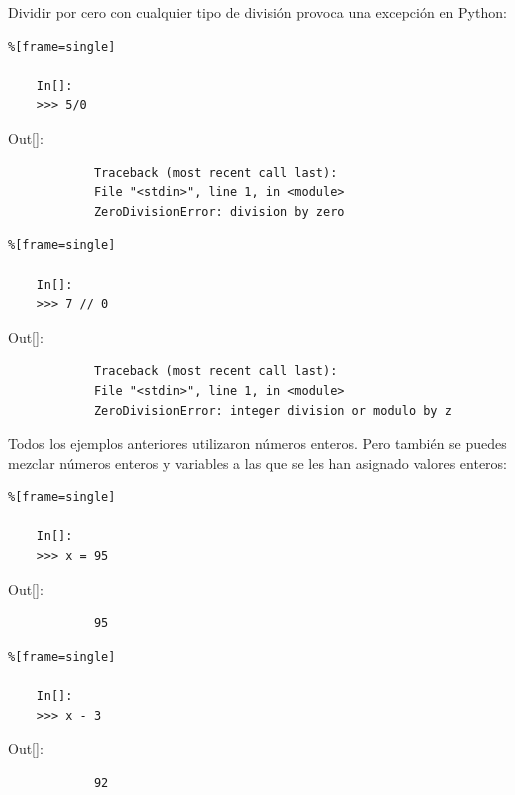 Dividir por cero con cualquier tipo de división provoca una excepción en Python:

\begin{lstlisting}%[frame=single]
	
	In[]:
	>>> 5/0
\end{lstlisting}

{\ttfamily\scriptsize\scriptsize 
	\hspace{-0.65cm}Out[]:\vspace{-0.15cm}	
	{\color{red} 	
		\begin{verbatim}
			Traceback (most recent call last):
			File "<stdin>", line 1, in <module>
			ZeroDivisionError: division by zero
		\end{verbatim}
}}
\vspace{-0.15cm}
\begin{lstlisting}%[frame=single]
	
	In[]:	
	>>> 7 // 0	
\end{lstlisting}

{\ttfamily\scriptsize\scriptsize 
	\hspace{-0.65cm}Out[]:\vspace{-0.15cm}	
	{\color{red} 	
		\begin{verbatim}
			Traceback (most recent call last):
			File "<stdin>", line 1, in <module>
			ZeroDivisionError: integer division or modulo by z
		\end{verbatim}
}}

Todos los ejemplos anteriores utilizaron números enteros. Pero también se puedes mezclar números enteros y variables a las que se les han asignado valores enteros:

\begin{lstlisting}%[frame=single]
	
	In[]:	
	>>> x = 95	
\end{lstlisting}

{\ttfamily\scriptsize\scriptsize 
	\hspace{-0.65cm}Out[]:\vspace{-0.15cm}	
	{\color{blue} 	
		\begin{verbatim}
			95
		\end{verbatim}
}}

\begin{lstlisting}%[frame=single]
	
	In[]:	
	>>> x - 3	
\end{lstlisting}

{\ttfamily\scriptsize\scriptsize 
	\hspace{-0.65cm}Out[]:\vspace{-0.15cm}	
	{\color{blue} 	
		\begin{verbatim}
			92
		\end{verbatim}
}}

